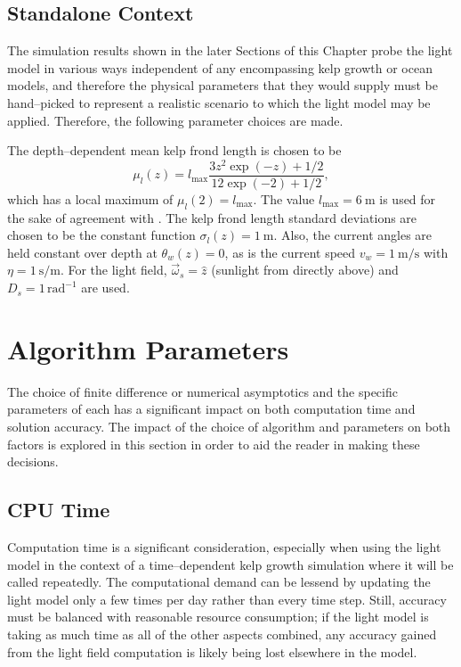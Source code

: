 \subsection{Standalone Context}
The simulation results shown in the later Sections of this Chapter probe the light model in various ways independent of any encompassing kelp growth or ocean models, and therefore the physical parameters that they would supply must be hand--picked to represent a realistic scenario to which the light model may be applied.
Therefore, the following parameter choices are made.

The depth--dependent mean kelp frond length is chosen to be
\begin{equation}
    \mu_l(z) = l_{\max}\frac{3z^2 \exp(-z) + 1/2}{12\exp(-2) + 1/2},
\end{equation}
which has a local maximum of $\mu_l(2)=l_{\max}$.
The value $l_{\max}=\SI{6}{\m}$ is used for the sake of agreement with \cite{norvik_design_2017}.
The kelp frond length standard deviations are chosen to be the constant function $\sigma_l(z) = \SI{1}{\m}$.
Also, the current angles are held constant over depth at $\theta_w(z)=0$, as is the current speed $v_w=\SI{1}{\m\per\s}$ with $\eta=\SI{1}{\s\per\m}$.
For the light field, $\vec{\omega}_s=\hat{z}$ (sunlight from directly above) and $D_s=1\, \mbox{rad}^{-1}$ are used.

\section{Algorithm Parameters}
The choice of finite difference or numerical asymptotics and the specific parameters of each has a significant impact on both computation time and solution accuracy.
The impact of the choice of algorithm and parameters on both factors is explored in this section in order to aid the reader in making these decisions.

\subsection{CPU Time}
Computation time is a significant consideration, especially when using the light model in the context of a time--dependent kelp growth simulation where it will be called repeatedly.
The computational demand can be lessend by updating the light model only a few times per day rather than every time step.
Still, accuracy must be balanced with reasonable resource consumption; if the light model is taking as much time as all of the other aspects combined, any accuracy gained from the light field computation is likely being lost elsewhere in the model.

